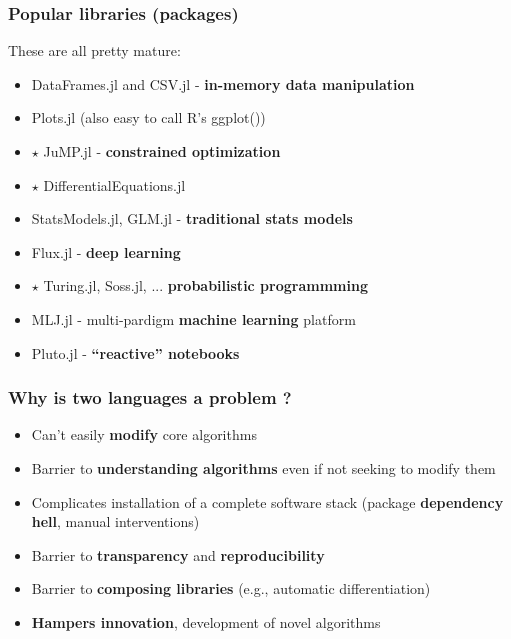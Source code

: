 \documentclass[t]{beamer}
\newcommand\df{\bf\color{Maroon}}
\begin{document}
  


\begin{frame}
  \frametitle{Popular libraries (packages)}
  These are all pretty mature:
  \begin{itemize}
  \item DataFrames.jl and CSV.jl  - {\df in-memory data manipulation}
  \item Plots.jl (also easy to call R's ggplot())
  \item $\star$ JuMP.jl - {\df constrained optimization}
  \item $\star$ DifferentialEquations.jl
  \item StatsModels.jl, GLM.jl - {\df traditional stats models}
  \item Flux.jl  - {\df deep learning}
  \item $\star$ Turing.jl, Soss.jl, ... {\df probabilistic programmming}
  \item MLJ.jl - multi-pardigm {\df machine learning} platform
  \item Pluto.jl - {\df ``reactive'' notebooks}
  \end{itemize}
\end{frame}


  
\begin{frame}
  \frametitle{Why  is two languages a problem ?}
  \begin{itemize}
    \item Can't easily {\df modify} core algorithms
    \item Barrier to {\df understanding algorithms} even if not seeking to modify them
    \item Complicates installation of a complete software stack
    (package {\df dependency hell}, manual interventions)
    \item Barrier to {\df transparency} and {\df reproducibility}
    \item Barrier to {\df composing libraries} (e.g., automatic differentiation)
    \item {\df Hampers innovation}, development of novel algorithms
  \end{itemize}
\end{frame}
\end{document}
